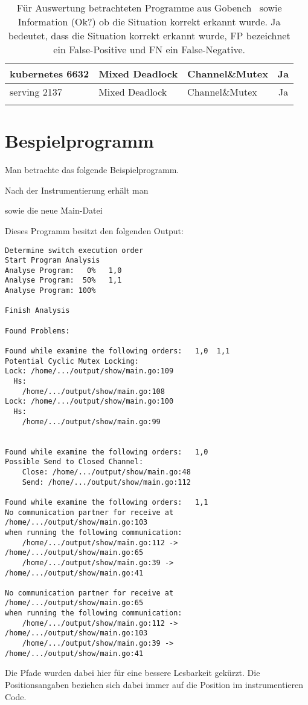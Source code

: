 \begin{longtable}[c]{|l|l|l|c|}
  kubernetes 6632      & Mixed Deadlock         & Channel\&Mutex         & Ja                                   \\ \hline
  serving 2137      & Mixed Deadlock         & Channel\&Mutex         & Ja                                   \\ \hline
  \caption{Für Auswertung betrachteten 
  Programme aus Gobench~\cite{gobench} sowie 
  Information (Ok?) ob die Situation korrekt erkannt wurde. Ja bedeutet, dass 
  die Situation korrekt erkannt wurde, FP bezeichnet ein False-Positive
  und FN ein False-Negative. }
  \label{App-Goker}
  \end{longtable}


\chapter{Bespielprogramm}\label{Appendix-2}
Man betrachte das folgende Beispielprogramm.
  
Nach der Instrumentierung erhält man

sowie die neue Main-Datei


Dieses Programm besitzt den folgenden Output:
\begin{verbatim}
Determine switch execution order
Start Program Analysis
Analyse Program:   0%   1,0
Analyse Program:  50%   1,1
Analyse Program: 100%

Finish Analysis

Found Problems:

Found while examine the following orders:   1,0  1,1
Potential Cyclic Mutex Locking:
Lock: /home/.../output/show/main.go:109
  Hs:
    /home/.../output/show/main.go:108
Lock: /home/.../output/show/main.go:100
  Hs:
    /home/.../output/show/main.go:99


Found while examine the following orders:   1,0
Possible Send to Closed Channel:
    Close: /home/.../output/show/main.go:48
    Send: /home/.../output/show/main.go:112

Found while examine the following orders:   1,1
No communication partner for receive at /home/.../output/show/main.go:103 
when running the following communication:
    /home/.../output/show/main.go:112 -> /home/.../output/show/main.go:65
    /home/.../output/show/main.go:39 -> /home/.../output/show/main.go:41

No communication partner for receive at /home/.../output/show/main.go:65 
when running the following communication:
    /home/.../output/show/main.go:112 -> /home/.../output/show/main.go:103
    /home/.../output/show/main.go:39 -> /home/.../output/show/main.go:41
\end{verbatim}
Die Pfade wurden dabei hier für eine bessere Lesbarkeit gekürzt.
Die Positionsangaben beziehen sich dabei immer auf die Position im 
instrumentieren Code.   

